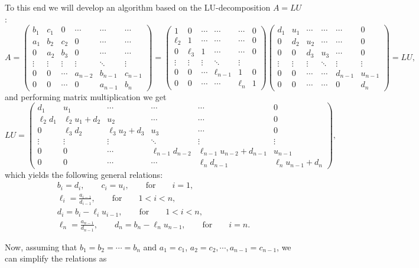 \documentclass[english,notitlepage]{revtex4-1}  %
\begin{document}
To this end we will develop an algorithm based on the LU-decomposition $A = LU$:
\begin{equation} A= 
	\begin{pmatrix}
	b_1 & c_1 & 0 & \cdots & \cdots & \cdots \\
	a_1 & b_2 & c_2 & 0  &\cdots & \cdots  \\ 
	0 & a_2 & b_3 & 0 & \cdots & \cdots \\
	\vdots & \vdots & \vdots & \vdots & \ddots & \vdots \\
	0 & 0 & \cdots & a_{n-2} & b_{n-1} & c_{n-1} \\
	0 & 0 & \cdots  & 0 & a_{n-1} & b_n
	\end{pmatrix}
	= 
	\begin{pmatrix}
	1 & 0 & \cdots &  \cdots & \cdots & 0 \\
	\ell_2 & 1 & \cdots & \cdots & \cdots & 0 \\
	0 & \ell_3 & 1 & \cdots & \cdots & 0 \\
	\vdots & \vdots & \vdots & \ddots & \vdots \\
	0 & 0 & \cdots & \ell_{n-1} & 1 & 0 \\
	0 & 0 & \cdots &\cdots & \ell_n & 1  
	\end{pmatrix}
	\begin{pmatrix}
	d_1 & u_1 & \cdots & \cdots &\cdots & 0 \\ 
	0 & d_2 & u_2 & \cdots & \cdots & 0 \\
	0 & 0 & d_3 & u_3 & \cdots & 0 \\
	\vdots & \vdots & \vdots & \ddots & \vdots & \vdots \\
	0 & 0 & \cdots & \cdots & d_{n-1} & u_{n-1} \\
	0 & 0 & \cdots & \cdots & 0 & d_n
	\end{pmatrix}
	= LU,
\end{equation}
and performing matrix multiplication we get 
\begin{equation}
	LU = 
	\begin{pmatrix}
	d_1 & u_1 & \cdots & \cdots &\cdots & 0 \\ 
	\ell_2d_1 & \ell_2u_1 + d_2 & u_2 & \cdots & \cdots & 0 \\
	0 & \ell_3d_2 & \ell_3u_2 + d_3 & u_3 & \cdots & 0 \\
	\vdots & \vdots & \vdots & \ddots & \vdots & \vdots \\
	0 & 0 & \cdots & \ell_{n-1}d_{n-2} & \ell_{n-1}u_{n-2} + d_{n-1} & u_{n-1} \\
	0 & 0 & \cdots & \cdots & \ell_nd_{n-1} & \ell_n u_{n-1} + d_n
	\end{pmatrix},
\end{equation}
which yields the following general relations: 
\begin{gather}
	b_i = d_i, \qquad c_i = u_i, \qquad \text{for} \qquad i = 1,\\
	\ell_i = \frac{a_{i-1}}{d_{i-1}}, \qquad \text{for} \qquad 1 < i < n, \\
	d_i = b_i - \ell_iu_{i-1}, \qquad \text{for} \qquad 1 < i < n, \\
	\ell_n = \frac{a_{n-1}}{d_{n-1}}, \qquad d_n = b_n - \ell_n u_{n-1}, \qquad \text{for} \qquad i = n.
\end{gather}

Now, assuming that $b_1 = b_2 = \cdots = b_n$ and $a_1 = c_1$, $a_2 = c_2,  \cdots, a_{n-1} = c_{n-1}$, we can simplify the relations as 
\end{document}
